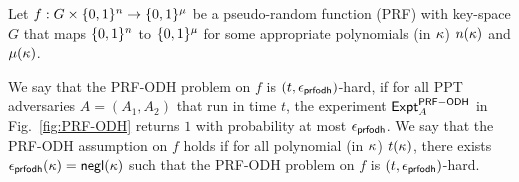 Let $f:G \times \{0,1\}^n \to \{0,1\}^{\mu}$ be a pseudo-random function (PRF) with
key-space $G$ that maps $\{0,1\}^n$ to $\{0,1\}^{\mu}$ for some appropriate
polynomials (in $\kappa$) $n(\kappa)$ and $\mu(\kappa)$.

\begin{definition}
 We say that the PRF-ODH problem on $f$ is $(t, \epsilon_{\sf prfodh})$-hard, if for all PPT adversaries $A=(A_1,A_2)$ that run in time $t$,
 the experiment $\mathsf{Expt}^{\sf PRF-ODH}_{A}$ in Fig.~\ref{fig:PRF-ODH}
 returns $1$ with probability at most $\epsilon_{\sf prfodh}$.
 We say that the PRF-ODH assumption on $f$ holds if
 for all polynomial (in $\kappa$) $t(\kappa)$,
 there exists $\epsilon_{\sf prfodh}(\kappa)=\mathsf{negl}(\kappa)$
 such that the PRF-ODH problem on $f$ is $(t,\epsilon_{\sf prfodh})$-hard.
\begin{figure*}[!htb]
\begin{center}
\caption{PRF-ODH security experiment}\label{fig:PRF-ODH}
\end{center}
\end{figure*}
\end{definition}

